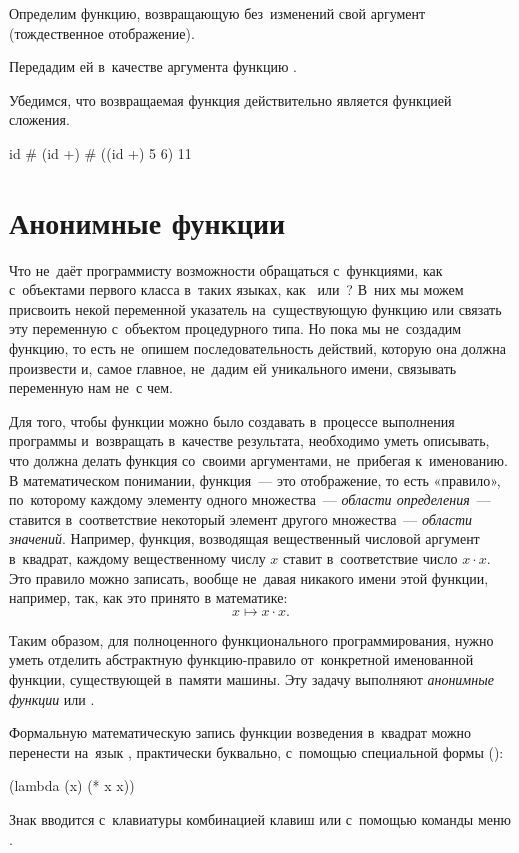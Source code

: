 \begin{example}{Определим функцию, возвращающую без~изменений свой аргумент (тождественное отображение).

\smallskip
Передадим ей в~качестве аргумента функцию \s{+}.

\medskip
Убедимся, что возвращаемая функция действительно является функцией сложения.}
\REPL
  {id}
  {\#<procedure:id>}
\smallskip
\REPL
  {(id +)}
  {\#<procedure:+>}
\smallskip
\REPL
  {((id +) 5 6)}
  {11}
\end{example}

\section{Анонимные функции}%
Что не~даёт программисту возможности обращаться с~функциями, как с~объектами первого класса в~таких языках, как~ или~? В~них мы можем присвоить некой переменной указатель на~существующую функцию или связать эту переменную с~объектом процедурного типа. Но пока мы не~создадим функцию, то есть не~опишем последовательность действий, которую она должна произвести и, самое главное, не~дадим ей уникального имени, связывать переменную нам не~с чем.

Для того, чтобы функции можно было создавать в~процессе выполнения программы и~возвращать в~качестве результата, необходимо уметь описывать, что должна делать функция со~своими аргументами, не~прибегая к~именованию. В математическом понимании, функция~--- это отображение, то есть «правило», по~которому каждому элементу одного множества~--- \emph{области определения}~--- ставится в~соответствие некоторый элемент другого множества~--- \emph{области значений}. Например, функция, возводящая вещественный числовой аргумент в~квадрат, каждому вещественному числу $x$ ставит в~соответствие число $x \cdot x$. Это правило можно записать, вообще не~давая никакого имени этой функции, например, так, как это принято в математике: $$x \mapsto x\cdot x.$$

Таким образом, для полноценного функционального программирования, нужно уметь отделить абстрактную функцию-правило от~конкретной именованной функции, существующей в~памяти машины. Эту задачу выполняют \emph{анонимные функции} или \emph{}.

Формальную математическую запись функции возведения в~квадрат можно перенести на~язык \Scheme, практически буквально, с~помощью специальной формы  ({\syntaxform {}}):
\begin{SchemeCode}[emph={x}]
(lambda (x) (* x x))  
\end{SchemeCode}
Знак  вводится с~клавиатуры комбинацией клавиш  или с~помощью команды меню .

